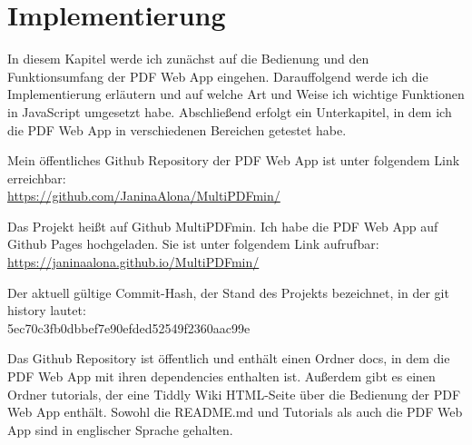 \chapter{Implementierung}
In diesem Kapitel werde ich zunächst auf die Bedienung und den Funktionsumfang der PDF Web App eingehen. Darauffolgend werde ich die Implementierung erläutern und auf welche Art und Weise ich wichtige Funktionen in JavaScript umgesetzt habe. Abschließend erfolgt ein Unterkapitel, in dem ich die PDF Web App in verschiedenen Bereichen getestet habe.

Mein öffentliches Github Repository der PDF Web App ist unter folgendem Link erreichbar: \\
\url{https://github.com/JaninaAlona/MultiPDFmin/}

Das Projekt heißt auf Github MultiPDFmin. Ich habe die PDF Web App auf Github Pages hochgeladen. Sie ist unter folgendem Link aufrufbar: \\
\url{https://janinaalona.github.io/MultiPDFmin/}

Der aktuell gültige Commit-Hash, der Stand des Projekts bezeichnet, in der git history lautet: \\
5ec70c3fb0dbbef7e90efded52549f2360aac99e

Das Github Repository ist öffentlich und enthält einen Ordner docs, in dem die PDF Web App mit ihren dependencies enthalten ist. Außerdem gibt es einen Ordner tutorials, der eine Tiddly Wiki HTML-Seite über die Bedienung der PDF Web App enthält. Sowohl die README.md und Tutorials als auch die PDF Web App sind in englischer Sprache gehalten.



